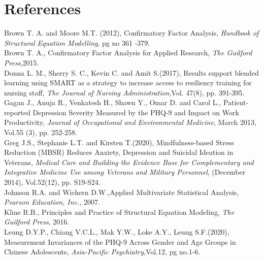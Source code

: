 \documentclass[12pt]{article}
\begin{document}
\newpage
\section*{References}
\indent Brown T. A.  and Moore M.T. (2012), Confirmatory Factor Analysis, \emph{Handbook of Structural Equation Modelling}, pg no 361 -379.\\
\indent Brown T. A., Confirmatory Factor Analysis for Applied Research, \emph{The Guilford Press},2015.\\
\indent Donna L. M., Sherry S. C., Kevin C. and Amit S.(2017), Results support blended learning using SMART as a strategy to increase access to resiliency training for nursing staff, \emph{The Journal of Nursing Administration},Vol. 47(8), pp. 391-395.\\
\indent Gagan J., Anuja R., Venkatesh H., Shawn Y., Omar D. and Carol L., Patient-reported Depression Severity Measured by the PHQ-9 and Impact on Work Productivity, \emph{Journal of Occupational and Environmental Medicine}, March 2013, Vol.55 (3), pp. 252-258.\\
\indent Greg J.S., Stephanie L.T. and Kirsten T.(2020), Mindfulness-based Stress Reduction (MBSR) Reduces Anxiety, Depression and Suicidal Ideation in Veterans, \emph{Medical Care and Building the Evidence Base for Complementary and Integrative Medicine Use among Veterans and Military Personnel}, (December 2014), Vol.52(12), pp. S19-S24.\\
\indent Johnson R.A. and Wichern D.W.,Applied Multivariate Statistical Analysis, \emph{ Pearson Education, Inc.}, 2007.\\
\indent Kline R.B., Principles and Practice of Structural Equation Modeling, \emph{ The Guilford Press}, 2016.\\
\indent Leung D.Y.P., Chiang V.C.L., Mak Y.W., Loke A.Y., Leung S.F.(2020), Measurement Invariances of the PHQ-9 Across Gender and Age Groups in Chinese Adolescents, \emph{Asia-Pacific Psychiatry},Vol.12, pg no.1-6.\\
\end{document}
